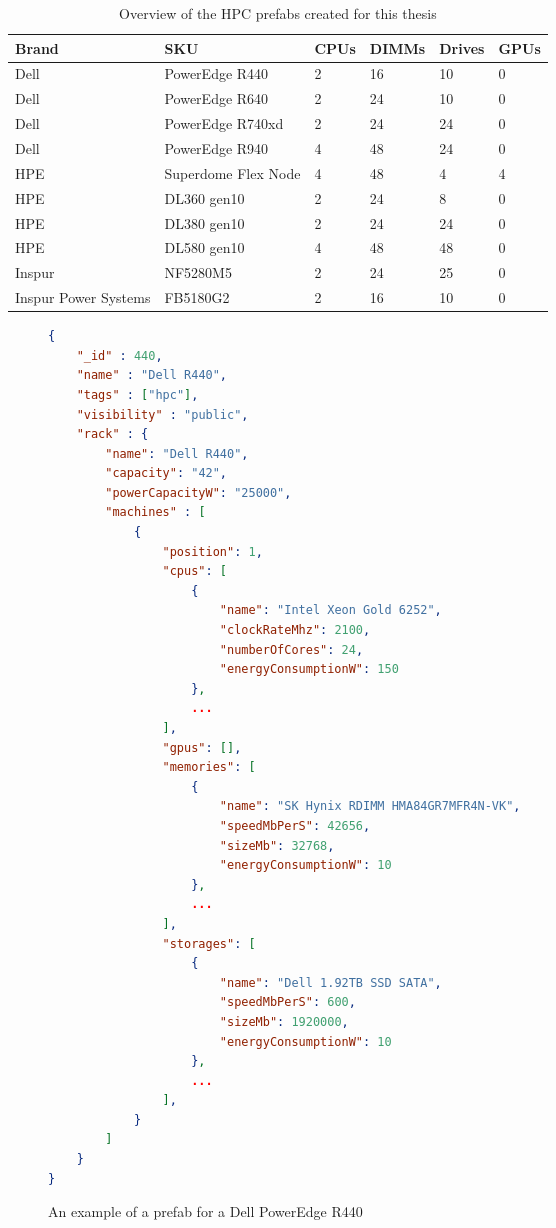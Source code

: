\documentclass[11pt]{article}
\begin{document}
			\begin{table}[]
			\centering
				\begin{tabular}{llllll}
					\toprule
					Brand       & SKU        & CPUs & DIMMs & Drives & GPUs \\ \midrule
					Dell                 & PowerEdge R440      & 2             & 16             & 10              & 0             \\
					Dell                 & PowerEdge R640      & 2             & 24             & 10              & 0             \\
					Dell                 & PowerEdge R740xd    & 2             & 24             & 24              & 0             \\
					Dell                 & PowerEdge R940      & 4             & 48             & 24              & 0             \\
					HPE                  & Superdome Flex Node & 4             & 48             & 4               & 4             \\
					HPE                  & DL360 gen10         & 2             & 24             & 8               & 0             \\
					HPE                  & DL380 gen10         & 2             & 24             & 24              & 0             \\
					HPE                  & DL580 gen10         & 4             & 48             & 48              & 0             \\
					Inspur               & NF5280M5            & 2             & 24             & 25              & 0             \\
					Inspur Power Systems & FB5180G2            & 2             & 16             & 10              & 0             \\ \bottomrule
				\end{tabular}
			\caption{Overview of the HPC prefabs created for this thesis}
			\label{tab:2}
			\end{table}
			\newpage
			\begin{figure}[]
			\centering
				\begin{lstlisting}[language=json]
{
	"_id" : 440,
	"name" : "Dell R440",
	"tags" : ["hpc"],
	"visibility" : "public",
	"rack" : {
		"name": "Dell R440",
		"capacity": "42",
		"powerCapacityW": "25000",
		"machines" : [
			{
				"position": 1,
				"cpus": [
					{
						"name": "Intel Xeon Gold 6252",
						"clockRateMhz": 2100,
						"numberOfCores": 24,
						"energyConsumptionW": 150
					},
					...
				],
				"gpus": [],
				"memories": [
					{
						"name": "SK Hynix RDIMM HMA84GR7MFR4N-VK",
						"speedMbPerS": 42656,
						"sizeMb": 32768,
						"energyConsumptionW": 10
					},
					...
				],
				"storages": [
					{
						"name": "Dell 1.92TB SSD SATA",
						"speedMbPerS": 600,
						"sizeMb": 1920000,
						"energyConsumptionW": 10
					},
					...
				],
			}
		]
	}
}			\end{lstlisting}
				\caption{An example of a prefab for a Dell PowerEdge R440}
				\label{fig:3}
			\end{figure}
\end{document}
